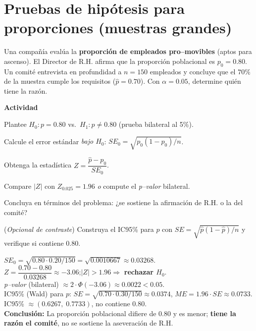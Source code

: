 
\section{Pruebas de hipótesis para proporciones (muestras grandes)}

\begin{ejercicio}[¿Quién tiene la razón sobre la pro-movilidad? (n=150)]
Una compañía evalúa la \textbf{proporción de empleados pro–movibles} (aptos para ascenso).
El Director de R.H. afirma que la proporción poblacional es $p_0=0.80$.
Un comité entrevista en profundidad a $n=150$ empleados y concluye que el $70\%$ de la muestra cumple los requisitos ($\hat p=0.70$).
Con $\alpha=0.05$, determine quién tiene la razón.


\textbf{Actividad}
\begin{pasos}
  \item Plantee $H_0: p = 0.80$ vs.\ $H_1: p \neq 0.80$ (prueba bilateral al 5\%).
  \item Calcule el error estándar \emph{bajo $H_0$}: $SE_0=\sqrt{p_0(1-p_0)/n}$.
  \item Obtenga la estadística $Z = \dfrac{\hat p - p_0}{SE_0}$.
  \item Compare $|Z|$ con $Z_{0.025}=1.96$ \emph{o} compute el \emph{p–valor} bilateral.
  \item Concluya en términos del problema: ¿se sostiene la afirmación de R.H. o la del comité?
  \item (\emph{Opcional de contraste}) Construya el IC95\% para $p$ con $SE=\sqrt{\hat p(1-\hat p)/n}$ y verifique si contiene $0.80$.
\end{pasos}

\begin{clave}
$SE_0=\sqrt{0.80\cdot 0.20/150}=\sqrt{0.0010667}\approx 0.03268$.\\
$Z=\dfrac{0.70-0.80}{0.03268}\approx -3.06$;\quad $|Z|>1.96 \Rightarrow$ \textbf{rechazar $H_0$}.\\
\emph{p–valor} (bilateral) $\approx 2\cdot \Phi(-3.06)\approx 0.0022<0.05$.\\
IC95\% (Wald) para $p$: $SE=\sqrt{0.70\cdot 0.30/150}\approx 0.0374$, \; $ME=1.96\cdot SE\approx 0.0733$.\\
IC95\% $\approx (0.6267,\; 0.7733)$, \; no contiene $0.80$.\\[2pt]
\textbf{Conclusión:} La proporción poblacional difiere de $0.80$ y es menor; \textbf{tiene la razón el comité}, no se sostiene la aseveración de R.H.
\end{clave}
\end{ejercicio}




